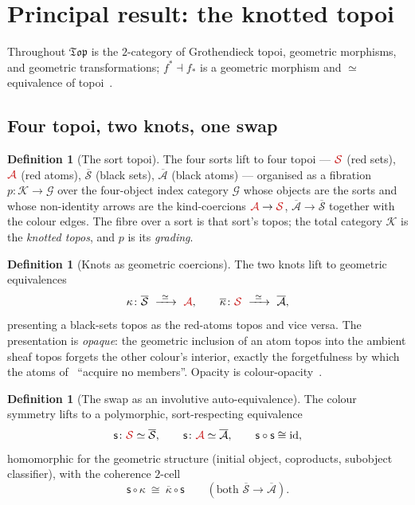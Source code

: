 \documentclass[11pt]{article}
\newcommand{\Top}{\mathfrak{Top}}
\newcommand{\swap}{\mathsf{s}}
\newcommand{\id}{\mathrm{id}}
\newcommand{\sorts}{\mathcal{G}}
\newcommand{\Ks}{\mathcal{K}}
\newcommand{\rc}[1]{\textcolor{redcopy}{#1}}   %
\newcommand{\St}{\rc{\mathcal S}}
\newcommand{\At}{\rc{\mathcal A}}
\newcommand{\bSt}{\overline{\mathcal S}}
\newcommand{\bAt}{\overline{\mathcal A}}
\theoremstyle{plain}
\theoremstyle{definition}
\newtheorem{definition}[theorem]{Definition}
\theoremstyle{remark}
\begin{document}
\section{Principal result: the knotted topoi}\label{sec:lift}

Throughout $\Top$ is the $2$-category of Grothendieck topoi, geometric morphisms, and geometric
transformations; $f^*\dashv f_*$ is a geometric morphism and $\simeq$ equivalence of
topoi~\cite{maclane,elephant}.

\subsection{Four topoi, two knots, one swap}

\begin{definition}[The sort topoi]\label{def:sorttopoi}
The four sorts lift to four topoi --- $\St$ (red sets), $\At$ (red atoms), $\bSt$ (black sets),
$\bAt$ (black atoms) --- organised as a fibration $p\colon\Ks\to\sorts$ over the four-object index
category $\sorts$ whose objects are the sorts and whose non-identity arrows are the kind-coercions
$\At\to\St$, $\bAt\to\bSt$ together with the colour edges. The fibre over a sort is that sort's topos;
the total category $\Ks$ is the \emph{knotted topos}, and $p$ is its \emph{grading}.
\end{definition}

\begin{definition}[Knots as geometric coercions]\label{def:knots}
The two knots lift to geometric equivalences
\[
\kappa\colon \bSt\ \xrightarrow{\ \simeq\ }\ \At,\qquad
\overline\kappa\colon \St\ \xrightarrow{\ \simeq\ }\ \bAt,
\]
presenting a black-sets topos as the red-atoms topos and vice versa. The presentation is
\emph{opaque}: the geometric inclusion of an atom topos into the ambient sheaf topos forgets the other
colour's interior, exactly the forgetfulness by which the atoms of~\cite[\S8.1]{rset} ``acquire no
members''. Opacity is colour-opacity~\cite[Rem.~2]{rset}.
\end{definition}

\begin{definition}[The swap as an involutive auto-equivalence]\label{def:swap}
The colour symmetry lifts to a polymorphic, sort-respecting equivalence
\[
\swap\colon\St\simeq\bSt,\qquad \swap\colon\At\simeq\bAt,\qquad \swap\circ\swap\cong\id,
\]
homomorphic for the geometric structure (initial object, coproducts, subobject classifier), with the
coherence $2$-cell
\begin{equation}\label{eq:cohere}
\swap\circ\kappa\ \cong\ \overline\kappa\circ\swap \qquad(\text{both }\bSt\to\bAt).
\end{equation}
\end{definition}
\end{document}
